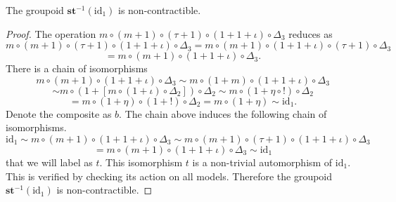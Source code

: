 \documentclass[10pt,a4paper]{amsart}
\begin{document}
\begin{proposition}\label{non_contract_lemma}
The groupoid $\mathbf{st}^{-1}(\text{id}_1)$ is non-contractible.
\end{proposition}

\begin{proof}
    The operation $m\circ (m+1)\circ (\tau+1)\circ(1+1+\iota)\circ\Delta_3$ reduces as
    \[
    m\circ (m+1)\circ (\tau+1)\circ(1+1+\iota)\circ\Delta_3=m\circ (m+1)\circ (1+1+\iota)\circ(\tau+1)\circ\Delta_3
    \]
    \[
    =m\circ (m+1)\circ (1+1+\iota)\circ\Delta_3.
    \]
    There is a chain of isomorphisms
    \[
    m\circ (m+1)\circ (1+1+\iota)\circ\Delta_3\sim m\circ (1+m)\circ (1+1+\iota)\circ\Delta_3
    \]
    \[
    \sim m\circ (1+[m\circ (1+\iota)\circ\Delta_2])\circ\Delta_2\sim m\circ(1+\eta\circ !)\circ\Delta_2
    \]
    \[
    = m\circ (1+\eta)\circ (1+!)\circ\Delta_2=m\circ(1+\eta)\sim\text{id}_1.
    \]
    Denote the composite as $b$. The chain above induces the following chain of isomorphisms.
    \[
    \text{id}_1\sim  m\circ (m+1)\circ (1+1+\iota)\circ\Delta_3\sim  m\circ (m+1)\circ(\tau+1)\circ (1+1+\iota)\circ\Delta_3
    \]
    \[
    =m\circ (m+1)\circ (1+1+\iota)\circ\Delta_3\sim\text{id}_1
    \]
    that we will label as $t$. This isomorphism $t$ is a non-trivial automorphism of $\text{id}_1$. This is verified by checking its action on all models. Therefore the groupoid $\mathbf{st}^{-1}(\text{id}_1)$ is non-contractible. 
\end{proof}
\end{document}
